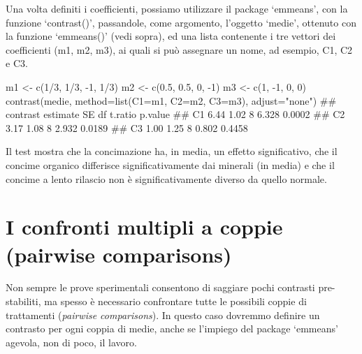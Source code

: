 \documentclass[a4paper,12pt,oneside]{book}
\newenvironment{Shaded}{}{}
\newcommand{\KeywordTok}[1]{#1}
\newcommand{\DataTypeTok}[1]{#1}
\newcommand{\DecValTok}[1]{#1}
\newcommand{\FloatTok}[1]{#1}
\newcommand{\StringTok}[1]{#1}
\newcommand{\CommentTok}[1]{#1}
\newcommand{\OperatorTok}[1]{#1}
\newcommand{\NormalTok}[1]{#1}
\begin{document}
Una volta definiti i coefficienti, possiamo utilizzare il package `emmeans', con la funzione `contrast()', passandole, come argomento, l'oggetto `medie', ottenuto con la funzione `emmeans()' (vedi sopra), ed una lista contenente i tre vettori dei coefficienti (m1, m2, m3), ai quali si può assegnare un nome, ad esempio, C1, C2 e C3.

\small

\begin{Shaded}
\begin{Highlighting}[]
\NormalTok{m1 <-}\StringTok{ }\KeywordTok{c}\NormalTok{(}\DecValTok{1}\OperatorTok{/}\DecValTok{3}\NormalTok{, }\DecValTok{1}\OperatorTok{/}\DecValTok{3}\NormalTok{,  }\DecValTok{-1}\NormalTok{, }\DecValTok{1}\OperatorTok{/}\DecValTok{3}\NormalTok{)}
\NormalTok{m2 <-}\StringTok{ }\KeywordTok{c}\NormalTok{(}\FloatTok{0.5}\NormalTok{, }\FloatTok{0.5}\NormalTok{, }\DecValTok{0}\NormalTok{, }\DecValTok{-1}\NormalTok{)}
\NormalTok{m3 <-}\StringTok{ }\KeywordTok{c}\NormalTok{(}\DecValTok{1}\NormalTok{, }\DecValTok{-1}\NormalTok{, }\DecValTok{0}\NormalTok{, }\DecValTok{0}\NormalTok{)}
\KeywordTok{contrast}\NormalTok{(medie, }\DataTypeTok{method=}\KeywordTok{list}\NormalTok{(}\DataTypeTok{C1=}\NormalTok{m1, }\DataTypeTok{C2=}\NormalTok{m2, }\DataTypeTok{C3=}\NormalTok{m3), }
           \DataTypeTok{adjust=}\StringTok{"none"}\NormalTok{)}
\CommentTok{##  contrast estimate   SE df t.ratio p.value}
\CommentTok{##  C1           6.44 1.02  8 6.328   0.0002 }
\CommentTok{##  C2           3.17 1.08  8 2.932   0.0189 }
\CommentTok{##  C3           1.00 1.25  8 0.802   0.4458}
\end{Highlighting}
\end{Shaded}

\normalsize

Il test mostra che la concimazione ha, in media, un effetto significativo, che il concime organico differisce significativamente dai minerali (in media) e che il concime a lento rilascio non è significativamente diverso da quello normale.

\hypertarget{i-confronti-multipli-a-coppie-pairwise-comparisons}{%
\section{I confronti multipli a coppie (pairwise comparisons)}\label{i-confronti-multipli-a-coppie-pairwise-comparisons}}

Non sempre le prove sperimentali consentono di saggiare pochi contrasti pre-stabiliti, ma spesso è necessario confrontare tutte le possibili coppie di trattamenti (\emph{pairwise comparisons}). In questo caso dovremmo definire un contrasto per ogni coppia di medie, anche se l'impiego del package `emmeans' agevola, non di poco, il lavoro.
\end{document}
